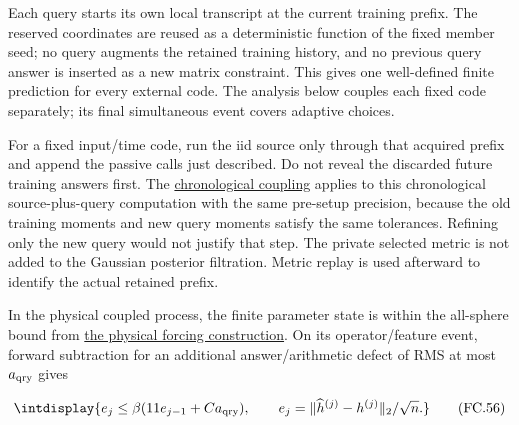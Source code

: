 
Each query starts its own local transcript at the current training prefix. The reserved coordinates are reused as a deterministic function of the fixed member seed; no query augments the retained training history, and no previous query answer is inserted as a new matrix constraint. This gives one well-defined finite prediction for every external code. The analysis below couples each fixed code separately; its final simultaneous event covers adaptive choices.



For a fixed input/time code, run the iid source only through that acquired prefix and append the passive calls just described. Do not reveal the discarded future training answers first. The \hyperref[int:decoder-precision-coupling]{chronological coupling} applies to this chronological source-plus-query computation with the same pre-setup precision, because the old training moments and new query moments satisfy the same tolerances. Refining only the new query would not justify that step. The private selected metric is not added to the Gaussian posterior filtration. Metric replay is used afterward to identify the actual retained prefix.



In the physical coupled process, the finite parameter state is within the all-sphere bound from \hyperref[int:decoder-physical-forcing]{the physical forcing construction}. On its operator/feature event, forward subtraction for an additional answer/arithmetic defect of RMS at most \(a_{\rm qry}\) gives


\begingroup\renewcommand{\theHequation}{intdisplay.762}
\begin{equation}
\intdisplay{
e_j\le\beta(11e_{j-1}+Ca_{\rm qry}),
\qquad e_j=\|\widehat h^{(j)}-h^{(j)}\|_2/\sqrt n.
}
\tag{FC.56}
\label{int:eq-0361-fc-56}
\end{equation}
\endgroup


